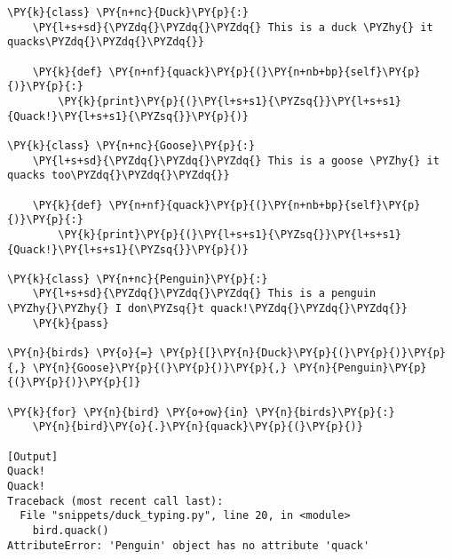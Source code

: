 \begin{Verbatim}[label=\makebox{\url{https://bitbucket.org/lbaldini/programming/src/tip/snippets/duck\_typing.py}},commandchars=\\\{\}]
\PY{k}{class} \PY{n+nc}{Duck}\PY{p}{:}
    \PY{l+s+sd}{\PYZdq{}\PYZdq{}\PYZdq{} This is a duck \PYZhy{} it quacks\PYZdq{}\PYZdq{}\PYZdq{}}
    
    \PY{k}{def} \PY{n+nf}{quack}\PY{p}{(}\PY{n+nb+bp}{self}\PY{p}{)}\PY{p}{:}
        \PY{k}{print}\PY{p}{(}\PY{l+s+s1}{\PYZsq{}}\PY{l+s+s1}{Quack!}\PY{l+s+s1}{\PYZsq{}}\PY{p}{)}
        
\PY{k}{class} \PY{n+nc}{Goose}\PY{p}{:}
    \PY{l+s+sd}{\PYZdq{}\PYZdq{}\PYZdq{} This is a goose \PYZhy{} it quacks too\PYZdq{}\PYZdq{}\PYZdq{}}
    
    \PY{k}{def} \PY{n+nf}{quack}\PY{p}{(}\PY{n+nb+bp}{self}\PY{p}{)}\PY{p}{:}
        \PY{k}{print}\PY{p}{(}\PY{l+s+s1}{\PYZsq{}}\PY{l+s+s1}{Quack!}\PY{l+s+s1}{\PYZsq{}}\PY{p}{)}

\PY{k}{class} \PY{n+nc}{Penguin}\PY{p}{:}
    \PY{l+s+sd}{\PYZdq{}\PYZdq{}\PYZdq{} This is a penguin \PYZhy{}\PYZhy{} I don\PYZsq{}t quack!\PYZdq{}\PYZdq{}\PYZdq{}}
    \PY{k}{pass} 

\PY{n}{birds} \PY{o}{=} \PY{p}{[}\PY{n}{Duck}\PY{p}{(}\PY{p}{)}\PY{p}{,} \PY{n}{Goose}\PY{p}{(}\PY{p}{)}\PY{p}{,} \PY{n}{Penguin}\PY{p}{(}\PY{p}{)}\PY{p}{]}

\PY{k}{for} \PY{n}{bird} \PY{o+ow}{in} \PY{n}{birds}\PY{p}{:}
    \PY{n}{bird}\PY{o}{.}\PY{n}{quack}\PY{p}{(}\PY{p}{)}

[Output]
Quack!
Quack!
Traceback (most recent call last):
  File "snippets/duck_typing.py", line 20, in <module>
    bird.quack()
AttributeError: 'Penguin' object has no attribute 'quack'
\end{Verbatim}